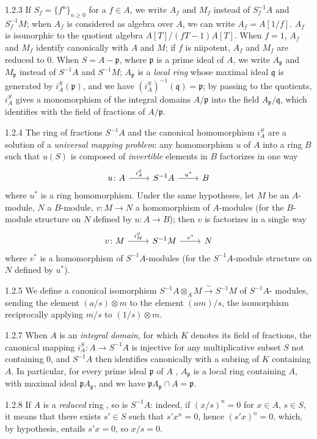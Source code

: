 \documentclass[../main.tex]{subfiles}
\begin{document}
\begin{env}{1.2.3}
If $S_f=\{f^n\}_{n\geq 0}$ for a $f\in A$, we write $A_f$ and $M_f$ instead of $S_f^{-1}A$ and $S_f^{-1}M$; when $A_f$ is
considered as algebra over $A$, we can write $A_f=A[1/f]$. $A_f$ is isomorphic to the quotient algebra $A[T]/(fT-1)A[T]$.
When $f=1$, $A_f$ and $M_f$ identify canonically with $A$ and $M$; if $f$ is niipotent, $A_f$ and $M_f$ are reduced to $0$.
When $S=A-\mathfrak{p}$, where $\mathfrak{p}$ is a prime ideal of $A$, we write $A_\mathfrak{p}$ and $M_\mathfrak{p}$ instead of $S^{-1}A$ and $S^{-1}M$;
$A_\mathfrak{p}$ is a \emph{local ring} whose maximal ideal $\mathfrak{q}$ is generated by $i_A^S(\mathfrak{p})$, and we have
$(i_A^S)^{-1}(\mathfrak{q})=\mathfrak{p}$; by passing to the quotients, $i_A^S$ gives a monomorphism of the integral domains $A/\mathfrak{p}$ into the
field $A_\mathfrak{p}/\mathfrak{q}$, which identifies with the field of fractions of $A/\mathfrak{p}$.
\end{env}

\begin{env}{1.2.4}
The ring of fractions $S^{-1}A$ and the canonical homomorphism $i_A^S$ are a solution of a \emph{universal mapping problem}:
any homomorphism $u$ of $A$ into a ring $B$ such that $u(S)$ is composed of \emph{invertible} elements in $B$ factorizes in
one way
\[
  \begin{tikzcd}
    u\colon A\ar[r,"i_A^S"] & S^{-1}A\ar[r,"u^\ast"] & B
  \end{tikzcd}
\]
where $u^\ast$ is a ring homomorphism. Under the same hypotheses, let $M$ be an
$A$-module, $N$ a $B$-module, $v\colon M\to N$ a homomorphism of $A$-modules (for the
$B$-module structure on $N$ defined by $u\colon A\to B$); then $v$ is factorizes in a single
way
\[
  \begin{tikzcd}
    v\colon M\ar[r,"i_M^S"] & S^{-1}M\ar[r,"v^\ast"] & N
  \end{tikzcd}
\]
where $v^\ast$ is a homomorphism of $S^{-1}A$-modules (for the $S^{-1}A$-module structure 
on $N$ defined by $u^\ast$).
\end{env}

\begin{env}{1.2.5}
We define a canonical isomorphism $S^{-1}A\otimes_A M\xrightarrow{\sim}S^{-1}M$ of $S^{-1}A$-
modules, sending the element $(a/s)\otimes m$ to the element $(am)/s$, the isomorphism
reciprocally applying $m/s$ to $(1/s)\otimes m$.
\end{env}

\begin{env}{1.2.7}
When $A$ is an \emph{integral domain}, for which $K$ denotes its field of fractions, the canonical mapping $i_A^S\colon A\to S^{-1}A$
is injective for any multiplicative subset $S$ not containing $0$, and $S^{-1}A$ then identifies canonically with a subring of $K$
containing $A$. In particular, for every prime ideal $\mathfrak{p}$ of $A$ , $A_\mathfrak{p}$ is a local ring containing $A$,
with maximal ideal $\mathfrak{p}A_\mathfrak{p}$, and we have $\mathfrak{p}A_\mathfrak{p}\cap A=\mathfrak{p}$.
\end{env}

\begin{env}{1.2.8}
If $A$ is a \emph{reduced} ring , so is $S^{-1}A$: indeed, if $(x/s)^n=0$ for $x\in A$, $s\in S$, it means that
there exists $s'\in S$ such that $s'x^n=0$, hence $(s'x)^n=0$, which, by hypothesis, entails $s'x=0$, so $x/s=0$.
\end{env}
\end{document}
